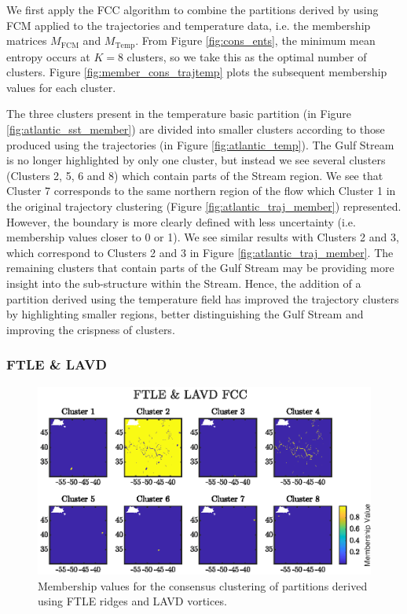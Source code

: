 \documentclass[a4paper, fontsize=12pt]{article}
\begin{document}
We first apply the FCC algorithm to combine the partitions derived by using FCM applied to the trajectories and temperature data, i.e. the membership matrices \(M_{\text{FCM}}\) and \(M_{\text{Temp}}\). From Figure \ref{fig:cons_ents}, the minimum mean entropy occurs at \(K = 8\) clusters, so we take this as the optimal number of clusters. Figure \ref{fig:member_cons_trajtemp} plots the subsequent membership values for each cluster.

The three clusters present in the temperature basic partition (in Figure \ref{fig:atlantic_sst_member}) are divided into smaller clusters according to those produced using the trajectories (in Figure \ref{fig:atlantic_temp}). The Gulf Stream is no longer highlighted by only one cluster, but instead we see several clusters (Clusters 2, 5, 6 and 8) which contain parts of the Stream region. We see that Cluster 7 corresponds to the same northern region of the flow which Cluster 1 in the original trajectory clustering (Figure \ref{fig:atlantic_traj_member}) represented. However, the boundary is more clearly defined with less uncertainty (i.e. membership values closer to 0 or 1). We see similar results with Clusters  2 and 3, which correspond to Clusters 2 and 3 in Figure \ref{fig:atlantic_traj_member}. The remaining clusters that contain parts of the Gulf Stream may be providing more insight into the sub-structure within the Stream. Hence, the addition of a partition derived using the temperature field has improved the trajectory clusters by highlighting smaller regions, better distinguishing the Gulf Stream and improving the crispness of clusters.


\subsubsection{FTLE \& LAVD}
\begin{figure}
\begin{center}
	\includegraphics[scale = 1.3]{../figures/atlantic_member_ftlelavd.eps}
	\caption{Membership values for the consensus clustering of partitions derived using FTLE ridges and LAVD vortices.}
	\label{fig:member_cons_ftlelavd}
\end{center}
\end{figure}
\end{document}
